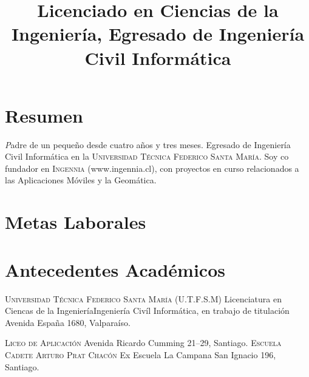 \documentclass[11pt,letterpaper,roman]{moderncv}
\title{\normalfont \small  Licenciado en Ciencias de la Ingeniería,  Egresado
de Ingeniería Civil Informática}
\begin{document}
 \maketitle

\section*{\textbf{Resumen}} \textsl Padre de un pequeño desde cuatro
años y tres meses. Egresado de Ingeniería Civil Informática en la
\textsc{Universidad Técnica Federico Santa María}. Soy co fundador en
\textsc{Ingennia} (www.ingennia.cl), con proyectos en curso relacionados a las
Aplicaciones Móviles y la Geomática.

\section{Metas Laborales} 

\section{Antecedentes Académicos}
 {\textsc{Universidad T\'ecnica Federico Santa
Mar\'ia (U.T.F.S.M)}} {Licenciatura en Ciencas de la Ingeniería}{Ingeniería
Civíl Informática, en trabajo de titulación} {} {Avenida España 1680,
Valparaíso.}
	

 {\textsc{Liceo de Aplicaci\'on}} {} {} {} {Avenida
Ricardo Cumming 21--29, Santiago.}
 {\textsc{Escuela Cadete Arturo Prat Chac\'on}} {Ex
Escuela La Campana} {} {} {San Ignacio 196, Santiago.}
\end{document}
